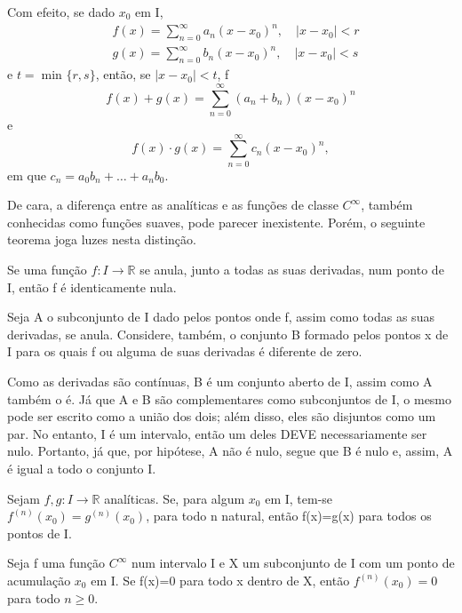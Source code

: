 \documentclass[../analysis_notes.tex]{subfiles}
\begin{document}
\begin{proof*}
	Com efeito, se dado \(x_{0}\) em I,
	\begin{align*}
		 & f(x)=\sum\limits_{n=0}^{\infty}a_{n}(x-x_{0})^{n},\quad |x-x_{0}|<r \\
		 & g(x)=\sum\limits_{n=0}^{\infty}b_{n}(x-x_{0})^{n},\quad |x-x_{0}|<s
	\end{align*}
	e \(t=\min_{}\{r, s\}\), então, se \(|x-x_{0}|<t\),   f
	\[
		f(x)+g(x) = \sum\limits_{n=0}^{\infty}(a_{n}+b_{n})(x-x_{0})^{n}
	\]
	e
	\[
		f(x)\cdot g(x)=\sum\limits_{n=0}^{\infty}c_{n}(x-x_{0})^{n},
	\]
	em que \(c_{n}=a_{0}b_{n}+\dotsc +a_{n}b_{0}\). \qedsymbol
\end{proof*}
De cara, a diferença entre as analíticas e as funções de classe \(C^{\infty}\), também conhecidas como funções suaves, pode parecer inexistente. Porém, o seguinte teorema joga luzes nesta distinção.
\begin{theorem*}
	Se uma função \(f:I\rightarrow \mathbb{R}\) se anula, junto a todas as suas derivadas, num ponto de I, então f é identicamente nula.
\end{theorem*}
\begin{proof*}
	Seja A o subconjunto de I dado pelos pontos onde f, assim como todas as suas derivadas, se anula. Considere, também, o conjunto B formado pelos pontos x de I para os quais f ou alguma de suas derivadas é diferente de zero.

	Como as derivadas são contínuas, B é um conjunto aberto de I, assim como A também o é. Já que A e B são complementares como subconjuntos de I, o mesmo pode ser escrito como a união dos dois; além disso, eles são disjuntos como um par. No entanto, I é um intervalo, então um deles DEVE necessariamente ser nulo. Portanto, já que, por hipótese, A não é nulo, segue que B é nulo e, assim, A é igual a todo o conjunto I. \qedsymbol
\end{proof*}
\begin{crl*}
	Sejam \(f, g :I\rightarrow \mathbb{R}\) analíticas. Se, para algum \(x_{0}\) em I, tem-se \(f^{(n)}(x_{0})=g^{(n)}(x_{0})\), para todo n natural, então f(x)=g(x) para todos os pontos de I.
\end{crl*}
\begin{lemma*}
	Seja f uma função \(C^{\infty}\) num intervalo I e X um subconjunto de I com um ponto de acumulação \(x_{0}\) em I. Se f(x)=0 para todo x dentro de X, então \(f^{(n)}(x_{0})=0\) para todo \(n\geq 0\).
\end{lemma*}
\end{document}
